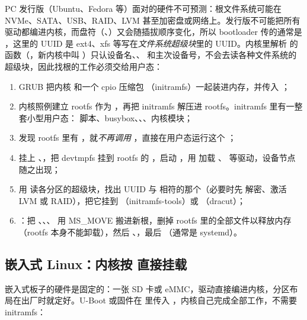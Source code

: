 PC 发行版（Ubuntu、Fedora 等）面对的硬件不可预测：根文件系统可能在 NVMe、SATA、USB、RAID、LVM 甚至加密盘或网络上。发行版不可能把所有驱动都编进内核，而盘符（、）又会随插拔顺序变化，所以 bootloader 传的通常是 ，这里的 UUID 是 ext4、xfs 等写在\emph{文件系统超级块}里的 UUID。内核里解析  的函数（，新内核中叫 ）只认设备名、、 和主次设备号，不会去读各种文件系统的超级块，因此找根的工作必须交给用户态：

\begin{enumerate}
  \item GRUB 把内核  和一个 cpio 压缩包 （initramfs）一起装进内存，并传入 ；
  \item 内核照例建立 rootfs 作为 \code{/}，再把 initramfs 解压进 rootfs。initramfs 里有一整套小型用户态： 脚本、busybox、、、内核模块；
  \item {} 发现 rootfs 里有 ，就\emph{不再调用} ，直接在用户态运行这个 ；
  \item {} 挂上 、，把 devtmpfs 挂到 rootfs 的 ，启动 ，用  加载 、 等驱动，设备节点随之出现；
  \item 用  读各分区的超级块，找出 UUID 与  相符的那个（必要时先  解密、激活 LVM 或 RAID），把它挂到 （initramfs-tools）或 （dracut）；
  \item {}：把 、、、 用 MS\_MOVE 搬进新根，删掉 rootfs 里的全部文件以释放内存（rootfs 本身不能卸载），然后 、，最后 （通常是 systemd）。
\end{enumerate}

\subsection{嵌入式 Linux：内核按  直接挂载}

嵌入式板子的硬件是固定的：一张 SD 卡或 eMMC，驱动直接编进内核，分区布局在出厂时就定好。U-Boot 或固件在  里传入 ，内核自己完成全部工作，不需要 initramfs：

